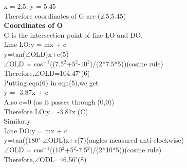 \documentclass[a4paper,12pt]{article}
\begin{document}
\hspace*{1cm}   x = 2.5;  y = 5.45\\

Therefore coordinates of G are (2.5,5.45)\\

\textbf{Coordinates of O}\\

G is the intersection point of line LO and DO.\\

Line LO:y = mx + c\\

\hspace*{0.5cm}y=tan($\angle$OLD)x+c\hspace*{2cm}(5) \\

$\angle$OLD = cos$^-$$^1$((7.5$^2$+5$^2$-10$^2$)/(2*7.5*5))\hspace*{2cm}(cosine rule)\\

Therefore,$\angle$OLD=104.47$^{\circ}$\hspace*{2cm}(6)\\

Putting eqn(6) in eqn(5),we get\\

y = -3.87x + c\\

Also c=0       \hspace{3cm} (as it passes through (0,0))\\

Therefore LO:y= -3.87x  \hspace*{2cm}(C)\\

Similarly\\


Line DO:y = mx + c\\

\hspace*{0.5cm}y=tan((180$^{\circ}$-$\angle$ODL)x+c\hspace*{2cm}(7)(angles measured anti-clockwise) \\

$\angle$OLD = cos$^-$$^1$((10$^2$+5$^2$-7.5$^2$)/(2*10*5))\hspace*{2cm}(cosine rule)\\

Therefore,$\angle$ODL=46.56$^{\circ}$\hspace*{2cm}(8)\\
\end{document}
